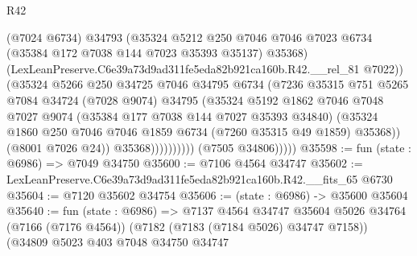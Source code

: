 \begin{lexlean}{R42}
\begin{coremodule}
{                                (@7024 @6734)
                                @34793
                                (@35324
                                  @5212
                                  @250
                                  @7046
                                  @7046
                                  @7023
                                  @6734
                                  (@35384 @172 @7038 @144 @7023 @35393 @35137)
                                  @35368)
                                (LexLeanPreserve.C6e39a73d9ad311fe5eda82b921ca160b.R42.__rel_81
                                  @7022))
                              (@35324
                                @5266
                                @250
                                @34725
                                @7046
                                @34795
                                @6734
                                (@7236
                                  @35315
                                  @751
                                  @5265
                                  @7084
                                  @34724
                                  (@7028 @9074)
                                  @34795
                                  (@35324
                                    @5192
                                    @1862
                                    @7046
                                    @7048
                                    @7027
                                    @9074
                                    (@35384 @177 @7038 @144 @7027 @35393 @34840)
                                    (@35324
                                      @1860
                                      @250
                                      @7046
                                      @7046
                                      @1859
                                      @6734
                                      (@7260 @35315 @49 @1859)
                                      @35368))
                                  (@8001 @7026 @24))
                                @35368))))))))))
            (@7505 @34806)))))
@35598 := fun (state : @6986) => @7049 @34750
@35600 := @7106 @4564 @34747
@35602 := LexLeanPreserve.C6e39a73d9ad311fe5eda82b921ca160b.R42.__fits_65 @6730
@35604 := @7120 @35602 @34754
@35606 := (state : @6986) -> @35600 @35604
@35640 := fun (state : @6986) =>
  @7137
    @4564
    @34747
    @35604
    @5026
    @34764
    (@7166 (@7176 @4564))
    (@7182 (@7183 (@7184 @5026) @34747 @7158))
    (@34809
      @5023
      @403
      @7048
      @34750
      @34747
}
\end{coremodule}
\end{lexlean}
